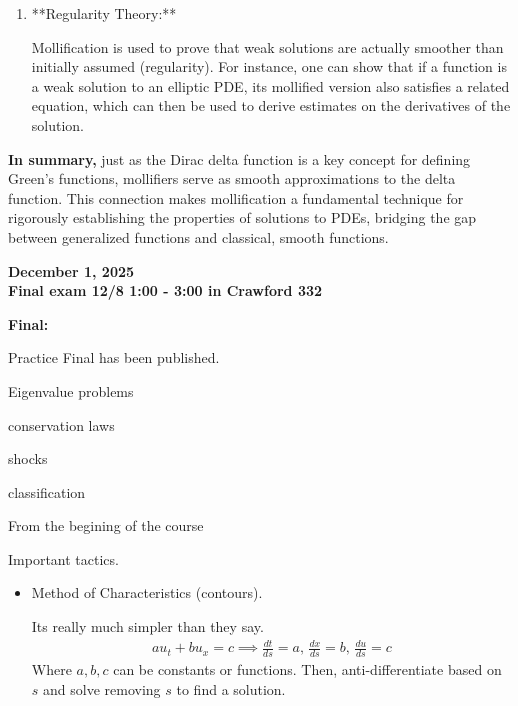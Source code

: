\documentclass[12pt,a4paper]{report}
\begin{document}
{\begin{description}
\begin{enumerate}
In proving the existence of weak solutions, one might first solve a regularized or mollified version of the PDE. Then, by taking the limit as \(\epsilon \to 0\), one can show that the sequence of smooth solutions converges to a weak solution of the original PDE.
\item  **Regularity Theory:** 

Mollification is used to prove that weak solutions are actually smoother than initially assumed (regularity). For instance, one can show that if a function is a weak solution to an elliptic PDE, its mollified version also satisfies a related equation, which can then be used to derive estimates on the derivatives of the solution.

\end{enumerate}

\item \textbf{In summary,} just as the Dirac delta function is a key concept for defining Green's functions, mollifiers serve as smooth approximations to the delta function. This connection makes mollification a fundamental technique for rigorously establishing the properties of solutions to PDEs, bridging the gap between generalized functions and classical, smooth functions.
\end{description}


\newpage
\textbf{\Large{December 1, 2025} \\Final exam 12/8 1:00 - 3:00 in Crawford 332}

\begin{description}
	\item \textbf{Final:} 
	
	Practice Final has been published.	
	
	Eigenvalue problems
	
	conservation laws
	
	shocks
	
	classification
	
	\item From the begining of the course

	Important tactics.
	\begin{itemize}
		\item Method of Characteristics (contours).
		
		Its really much simpler than they say.  
		\begin{align*}
			au_t+bu_x=c \implies \frac{dt}{ds}=a, \, \frac{dx}{ds}=b, \, \frac{du}{ds}=c
		\end{align*}Where $a,b,c$ can be constants or functions.  Then, anti-differentiate based on $s$ and solve removing $s$ to find a solution.
		

\end{itemize}
\end{description}}
\end{document}
